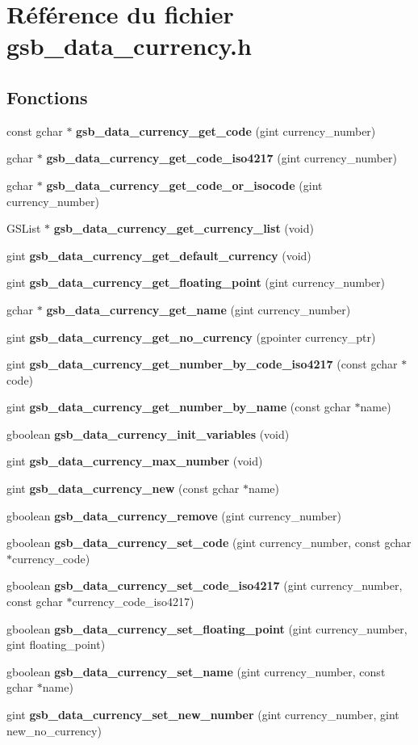 \section{Référence du fichier gsb\_\-data\_\-currency.h}
\label{gsb__data__currency_8h}
\subsection*{Fonctions}
\begin{DoxyCompactItemize}
\item 
const gchar $\ast$ {\bf gsb\_\-data\_\-currency\_\-get\_\-code} (gint currency\_\-number)
\item 
gchar $\ast$ {\bf gsb\_\-data\_\-currency\_\-get\_\-code\_\-iso4217} (gint currency\_\-number)
\item 
gchar $\ast$ {\bf gsb\_\-data\_\-currency\_\-get\_\-code\_\-or\_\-isocode} (gint currency\_\-number)
\item 
GSList $\ast$ {\bf gsb\_\-data\_\-currency\_\-get\_\-currency\_\-list} (void)
\item 
gint {\bf gsb\_\-data\_\-currency\_\-get\_\-default\_\-currency} (void)
\item 
gint {\bf gsb\_\-data\_\-currency\_\-get\_\-floating\_\-point} (gint currency\_\-number)
\item 
gchar $\ast$ {\bf gsb\_\-data\_\-currency\_\-get\_\-name} (gint currency\_\-number)
\item 
gint {\bf gsb\_\-data\_\-currency\_\-get\_\-no\_\-currency} (gpointer currency\_\-ptr)
\item 
gint {\bf gsb\_\-data\_\-currency\_\-get\_\-number\_\-by\_\-code\_\-iso4217} (const gchar $\ast$code)
\item 
gint {\bf gsb\_\-data\_\-currency\_\-get\_\-number\_\-by\_\-name} (const gchar $\ast$name)
\item 
gboolean {\bf gsb\_\-data\_\-currency\_\-init\_\-variables} (void)
\item 
gint {\bf gsb\_\-data\_\-currency\_\-max\_\-number} (void)
\item 
gint {\bf gsb\_\-data\_\-currency\_\-new} (const gchar $\ast$name)
\item 
gboolean {\bf gsb\_\-data\_\-currency\_\-remove} (gint currency\_\-number)
\item 
gboolean {\bf gsb\_\-data\_\-currency\_\-set\_\-code} (gint currency\_\-number, const gchar $\ast$currency\_\-code)
\item 
gboolean {\bf gsb\_\-data\_\-currency\_\-set\_\-code\_\-iso4217} (gint currency\_\-number, const gchar $\ast$currency\_\-code\_\-iso4217)
\item 
gboolean {\bf gsb\_\-data\_\-currency\_\-set\_\-floating\_\-point} (gint currency\_\-number, gint floating\_\-point)
\item 
gboolean {\bf gsb\_\-data\_\-currency\_\-set\_\-name} (gint currency\_\-number, const gchar $\ast$name)
\item 
gint {\bf gsb\_\-data\_\-currency\_\-set\_\-new\_\-number} (gint currency\_\-number, gint new\_\-no\_\-currency)
\end{DoxyCompactItemize}


